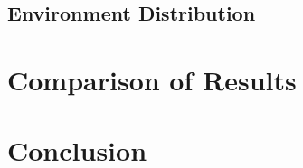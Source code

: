 \documentclass[twocolumn]{article}
\begin{document}
\subsection{Environment Distribution}


\section{Comparison of Results}


\section{Conclusion}




\end{document}
